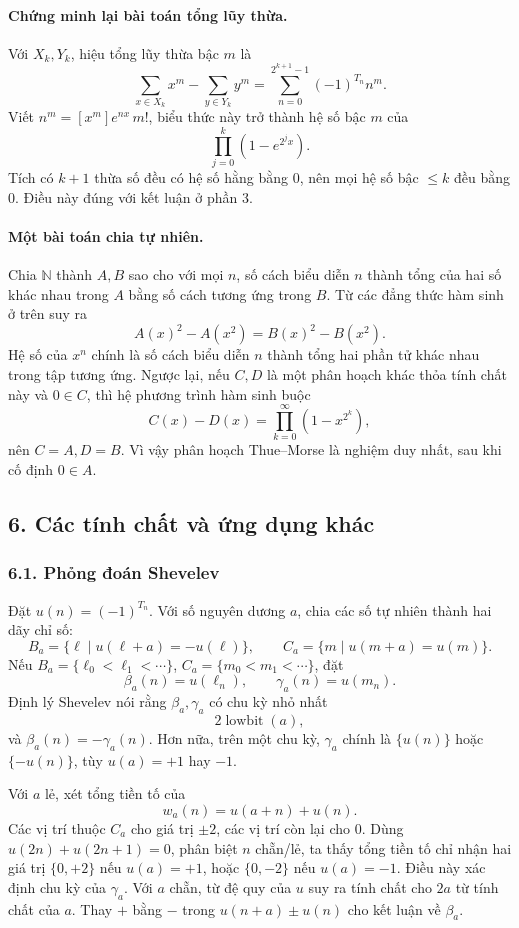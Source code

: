 \documentclass[11pt]{article}
\begin{document}
\paragraph{Chứng minh lại bài toán tổng lũy thừa.}
Với \(X_k,Y_k\), hiệu tổng lũy thừa bậc \(m\) là
\[
  \sum_{x\in X_k}x^m-\sum_{y\in Y_k}y^m
  =\sum_{n=0}^{2^{k+1}-1}(-1)^{T_n}n^m.
\]
Viết \(n^m=[x^m]e^{nx}\,m!\), biểu thức này trở thành hệ số bậc \(m\) của
\[
  \prod_{j=0}^{k}(1-e^{2^j x}).
\]
Tích có \(k+1\) thừa số đều có hệ số hằng bằng \(0\), nên mọi hệ số bậc
\(\le k\) đều bằng \(0\). Điều này đúng với kết luận ở phần 3.

\paragraph{Một bài toán chia tự nhiên.}
Chia \(\mathbb N\) thành \(A,B\) sao cho với mọi \(n\), số cách biểu diễn \(n\)
thành tổng của hai số khác nhau trong \(A\) bằng số cách tương ứng trong \(B\).
Từ các đẳng thức hàm sinh ở trên suy ra
\[
  A(x)^2-A(x^2)=B(x)^2-B(x^2).
\]
Hệ số của \(x^n\) chính là số cách biểu diễn \(n\) thành tổng hai phần tử khác
nhau trong tập tương ứng. Ngược lại, nếu \(C,D\) là một phân hoạch khác thỏa
tính chất này và \(0\in C\), thì hệ phương trình hàm sinh buộc
\[
  C(x)-D(x)=\prod_{k=0}^{\infty}(1-x^{2^k}),
\]
nên \(C=A,D=B\). Vì vậy phân hoạch Thue--Morse là nghiệm duy nhất, sau khi cố
định \(0\in A\).

\subsection*{6. Các tính chất và ứng dụng khác}

\subsubsection*{6.1. Phỏng đoán Shevelev}

Đặt \(u(n)=(-1)^{T_n}\). Với số nguyên dương \(a\), chia các số tự nhiên thành
hai dãy chỉ số:
\[
  B_a=\{\ell\mid u(\ell+a)=-u(\ell)\},\qquad
  C_a=\{m\mid u(m+a)=u(m)\}.
\]
Nếu \(B_a=\{\ell_0<\ell_1<\cdots\}\), \(C_a=\{m_0<m_1<\cdots\}\), đặt
\[
  \beta_a(n)=u(\ell_n),\qquad \gamma_a(n)=u(m_n).
\]
Định lý Shevelev nói rằng \(\beta_a,\gamma_a\) có chu kỳ nhỏ nhất
\[
  2\operatorname{lowbit}(a),
\]
và \(\beta_a(n)=-\gamma_a(n)\). Hơn nữa, trên một chu kỳ, \(\gamma_a\) chính là
\(\{u(n)\}\) hoặc \(\{-u(n)\}\), tùy \(u(a)=+1\) hay \(-1\).

Với \(a\) lẻ, xét tổng tiền tố của
\[
  w_a(n)=u(a+n)+u(n).
\]
Các vị trí thuộc \(C_a\) cho giá trị \(\pm2\), các vị trí còn lại cho \(0\).
Dùng \(u(2n)+u(2n+1)=0\), phân biệt \(n\) chẵn/lẻ, ta thấy tổng tiền tố chỉ
nhận hai giá trị \(\{0,+2\}\) nếu \(u(a)=+1\), hoặc \(\{0,-2\}\) nếu
\(u(a)=-1\). Điều này xác định chu kỳ của \(\gamma_a\). Với \(a\) chẵn, từ
đệ quy của \(u\) suy ra tính chất cho \(2a\) từ tính chất của \(a\). Thay
\(+\) bằng \(-\) trong \(u(n+a)\pm u(n)\) cho kết luận về \(\beta_a\).
\end{document}
